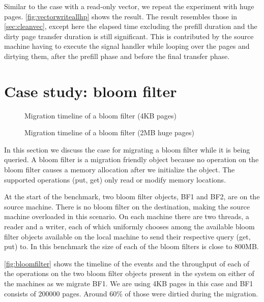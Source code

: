 Similar to the case with a read-only vector, we repeat the experiment with huge
pages. \autoref{fig:vectorwriteallhp} shows the result. The result resembles
those in \autoref{sec:cleanvec}, except here the elapsed time excluding the
prefill duration and the dirty page transfer duration is still significant. This
is contributed by the source machine having to execute the signal
handler while looping over the pages and dirtying them, after the
prefill phase and before the final transfer phase.


\section{Case study: bloom filter}
\label{sec:evalmigfriendly}

\begin{figure}[tp]
    \begin{center}
        
    \end{center}
    \caption{Migration timeline of a bloom filter (4KB pages)}
    \label{fig:bloomfilter}
\end{figure}


\begin{figure}[tp]
    \begin{center}
        
    \end{center}
    \caption{Migration timeline of a bloom filter (2MB huge pages)}
    \label{fig:bloomfilterhp}
\end{figure}


In this section we discuss the case for migrating a bloom filter while it is
being queried. A bloom filter is a migration friendly object because
no operation on the bloom filter causes a memory allocation after we initialize
the object. The supported operations (put, get) only read or modify memory
locations.

At the start of the benchmark, two bloom filter objects, BF1
and BF2, are on the source machine. There is no bloom filter on the destination,
making the source machine overloaded in this scenario. On each machine there
are two threads, a reader and a writer, each of which uniformly chooses among
the available bloom filter objects available on the local machine to send their
respective query (get, put) to. In this benchmark the size of each of the bloom
filters is close to 800MB.

\autoref{fig:bloomfilter} shows the timeline of the events and the throughput
of each of the operations on the two bloom filter objects present in the system
on either of the machines as we migrate BF1. We are using 4KB pages in this
case and BF1 consists of 200000 pages. Around 60\% of those were dirtied during
the migration.

